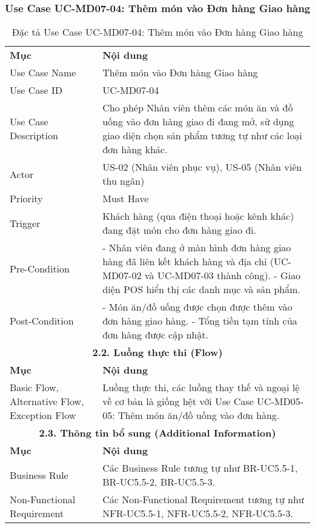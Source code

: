 \subsubsection{Use Case UC-MD07-04: Thêm món vào Đơn hàng Giao hàng}

\begin{longtable}{|m{4cm}|p{11cm}|}
\caption{Đặc tả Use Case UC-MD07-04: Thêm món vào Đơn hàng Giao hàng} \label{tab:uc_md07_04} \\
\hline

\endhead %
\hline
\endfoot %
\hline
\endlastfoot %
\multicolumn{2}{|c|}{\textbf{2.1. Tóm tắt (Summary)}} \\
\hline
\textbf{Mục} & \textbf{Nội dung} \\
\hline
Use Case Name & Thêm món vào Đơn hàng Giao hàng \\
\hline
Use Case ID & UC-MD07-04 \\
\hline
Use Case Description & Cho phép Nhân viên thêm các món ăn và đồ uống vào đơn hàng giao đi đang mở, sử dụng giao diện chọn sản phẩm tương tự như các loại đơn hàng khác. \\
\hline
Actor & US-02 (Nhân viên phục vụ), US-05 (Nhân viên thu ngân) \\
\hline
Priority & Must Have \\
\hline
Trigger & Khách hàng (qua điện thoại hoặc kênh khác) đang đặt món cho đơn hàng giao đi. \\
\hline
Pre-Condition & - Nhân viên đang ở màn hình đơn hàng giao hàng đã liên kết khách hàng và địa chỉ (UC-MD07-02 và UC-MD07-03 thành công). \newline - Giao diện POS hiển thị các danh mục và sản phẩm. \\
\hline
Post-Condition & - Món ăn/đồ uống được chọn được thêm vào đơn hàng giao hàng. \newline - Tổng tiền tạm tính của đơn hàng được cập nhật. \\
\hline
\multicolumn{2}{|c|}{\textbf{2.2. Luồng thực thi (Flow)}} \\
\hline
\textbf{Mục} & \textbf{Nội dung} \\
\hline
Basic Flow, Alternative Flow, Exception Flow & Luồng thực thi, các luồng thay thế và ngoại lệ về cơ bản là giống hệt với Use Case UC-MD05-05: Thêm món ăn/đồ uống vào đơn hàng. \\
\hline
\multicolumn{2}{|c|}{\textbf{2.3. Thông tin bổ sung (Additional Information)}} \\
\hline
\textbf{Mục} & \textbf{Nội dung} \\
\hline
Business Rule & Các Business Rule tương tự như BR-UC5.5-1, BR-UC5.5-2, BR-UC5.5-3. \\
\hline
Non-Functional Requirement & Các Non-Functional Requirement tương tự như NFR-UC5.5-1, NFR-UC5.5-2, NFR-UC5.5-3. \\
\hline
\end{longtable}


